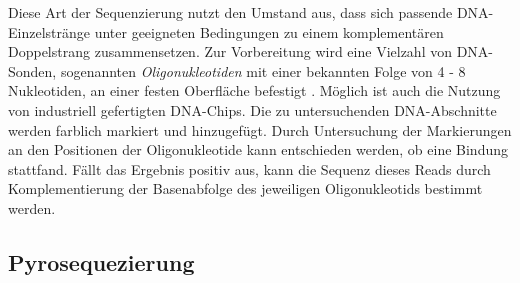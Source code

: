 Diese Art der Sequenzierung nutzt den Umstand aus, dass sich passende DNA-Einzelstränge unter geeigneten Bedingungen zu einem komplementären Doppelstrang zusammensetzen. Zur Vorbereitung wird eine Vielzahl von DNA-Sonden, sogenannten \textit{Oligonukleotiden} mit einer bekannten Folge von 4 - 8 Nukleotiden, an einer festen Oberfläche befestigt \citep{Gresham2008}. Möglich ist auch die Nutzung von industriell gefertigten DNA-Chips. Die zu untersuchenden DNA-Abschnitte werden farblich markiert und hinzugefügt. Durch Untersuchung der Markierungen an den Positionen der Oligonukleotide kann entschieden werden, ob eine Bindung stattfand. Fällt das Ergebnis positiv aus, kann die Sequenz dieses Reads durch Komplementierung der Basenabfolge des jeweiligen Oligonukleotids bestimmt werden.
\subsection{Pyrosequezierung}
\label{sec:bio:seq:pyro}

